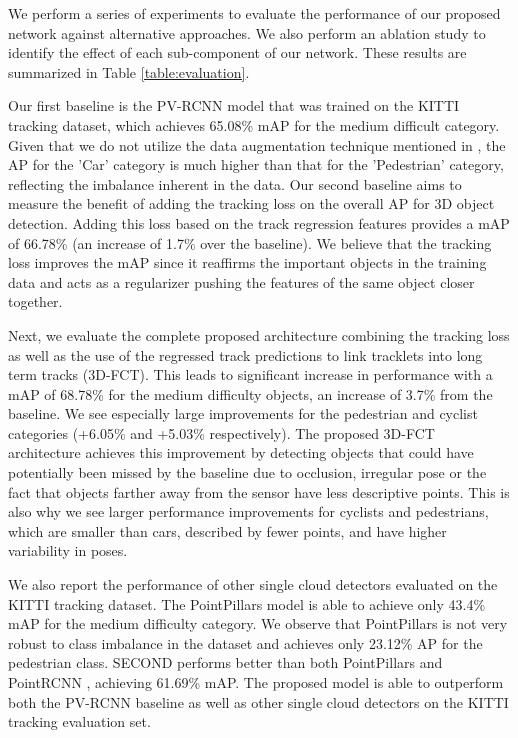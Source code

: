 \documentclass[10pt,twocolumn,letterpaper]{article}
\begin{document}
We perform a series of experiments to evaluate the performance of our proposed network against alternative approaches. We also perform an ablation study to identify the effect of each sub-component of our network. These results are summarized in Table \ref{table:evaluation}.

Our first baseline is the PV-RCNN \cite{Shi_2020_CVPR} model that was trained on the KITTI tracking dataset, which achieves 65.08\% mAP for the medium difficult category. Given that we do not utilize the data augmentation technique mentioned in \cite{Yan2018}, the AP for the 'Car' category is much higher than that for the 'Pedestrian' category, reflecting the imbalance inherent in the data. Our second baseline aims to measure the benefit of adding the tracking loss on the overall AP for 3D object detection. Adding this loss based on the track regression features provides a mAP of 66.78\% (an increase of 1.7\% over the baseline). We believe that the tracking loss improves the mAP since it reaffirms the important objects in the training data and acts as a regularizer pushing the features of the same object closer together.

Next, we evaluate the complete proposed architecture combining the tracking loss as well as the use of the regressed track predictions to link tracklets into long term tracks (3D-FCT). This leads to significant increase in performance with a mAP of 68.78\% for the medium difficulty objects, an increase of 3.7\% from the baseline. We see especially large improvements for the pedestrian and cyclist categories (+6.05\% and +5.03\% respectively). The proposed 3D-FCT architecture achieves this improvement by detecting objects that could have potentially been missed by the baseline due to occlusion, irregular pose or the fact that objects farther away from the sensor have less descriptive points. This is also why we see larger performance improvements for cyclists and pedestrians, which are smaller than cars, described by fewer points, and have higher variability in  poses.

We also report the performance of other single cloud detectors evaluated on the KITTI tracking dataset. The PointPillars \cite{Lang_2019_CVPR} model is able to achieve only 43.4\% mAP for the medium difficulty category.  We observe that PointPillars is not very robust to class imbalance in the dataset and achieves only 23.12\% AP for the pedestrian class. SECOND \cite{Yan2018} performs better than both PointPillars \cite{Lang_2019_CVPR} and PointRCNN \cite{Shi_2020_CVPR}, achieving 61.69\% mAP. The proposed model is able to outperform both the PV-RCNN baseline as well as other single cloud detectors on the KITTI tracking evaluation set.
\end{document}
